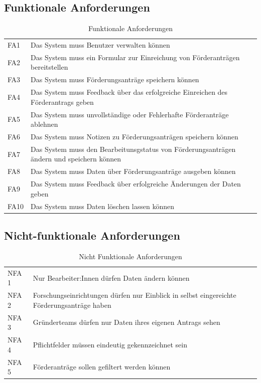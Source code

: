 \documentclass{article}
\begin{document}
\subsection{Funktionale Anforderungen}
\begin{table}[htbp]
\centering
\begin{tabularx}{\textwidth}{lX}
\midrule
FA1 & Das System muss Benutzer verwalten können\\
FA2  & Das System muss ein Formular zur Einreichung von Förderanträgen bereitstellen\\
FA3 & Das System muss Förderungsanträge speichern können\\
FA4 & Das System muss Feedback über das erfolgreiche Einreichen des Förderantrags geben\\
FA5 & Das System muss unvollständige oder Fehlerhafte Förderanträge ablehnen\\
FA6 & Das System muss Notizen zu Förderungsanträgen speichern können \\
FA7 & Das System muss den Bearbeitunsgstatus von Förderungsanträgen ändern und speichern können\\
FA8 & Das System muss Daten über Förderungsanträge ausgeben können\\
FA9 & Das System muss Feedback über erfolgreiche Änderungen der Daten geben \\
FA10 & Das System muss Daten löschen lassen können\\

\bottomrule
\end{tabularx}

\caption{Funktionale Anforderungen}
\end{table}
\subsection{Nicht-funktionale Anforderungen}
\begin{table}[htbp]
\centering
\begin{tabularx}{\textwidth}{lX}
\midrule
NFA 1 & Nur Bearbeiter:Innen dürfen Daten ändern können \\
NFA 2 & Forschungseinrichtungen dürfen nur Einblick in selbst eingereichte Förderungsanträge haben\\
NFA 3 & Gründerteams dürfen nur Daten ihres eigenen Antrags sehen\\
NFA 4 & Pflichtfelder müssen eindeutig gekennzeichnet sein \\
NFA 5 & Förderanträge sollen gefiltert werden können \\
\bottomrule
\end{tabularx}
\caption{Nicht Funktionale Anforderungen}
\end{table}
\end{document}
